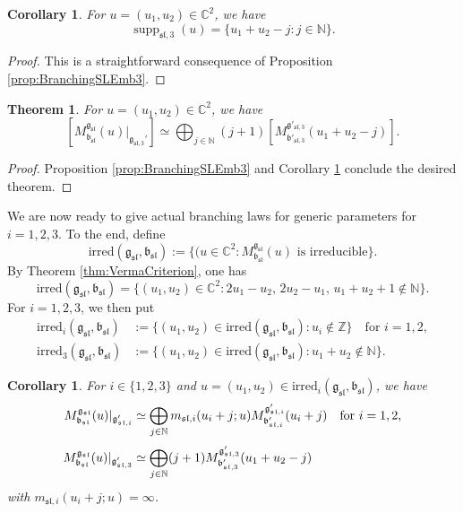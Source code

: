 \documentclass[a4paper,11pt,reqno]{amsart}
\newcommand{\frakg}{\mathfrak{g}}
\newcommand{\CC}{\mathbb{C}}
\newcommand{\0}{{\bf 0}}
\newcommand{\N}{\mathbb{N}}
\newcommand{\Z}{\mathbb{Z}}
\newcommand{\C}{\mathbb{C}}
\newcommand{\1}{{\bf 1}}
\newcommand{\frakb}{{\mathfrak b}}
\newcommand{\irred}{\mathrm{irred}}
\DeclareMathOperator{\supp}{supp}
\newcommand{\fraksl}{{\mathfrak{sl}}}
\newcommand{\Mbsl}{M^{\frakg_{\fraksl}}_{\frakb_{\fraksl}}}
\theoremstyle{plain}
\newtheorem{theorem}[equation]{Theorem}
\newtheorem{corollary}[equation]{Corollary}
\theoremstyle{definition}
\numberwithin{equation}{section}
\theoremstyle{definition}
\begin{document}
\begin{corollary}\label{cor:support_SL3}
For $u=(u_1,u_2) \in \C^2$, we have 
\begin{equation*}
\supp_{\fraksl,3}(u)
=\{u_1+u_2-j: j \in \N\}.
\end{equation*}
\end{corollary}

\begin{proof}
This is a straightforward consequence of Proposition \ref{prop:BranchingSLEmb3}.
\end{proof}

\begin{theorem}\label{thm:BranchingEmb_SL3}
For $u=(u_1, u_2) \in \CC^2$,
we have
\begin{equation}\label{eqn:bGVM_Emb3_sl}
[\Mbsl(u)\vert_{\frakg_{\fraksl,3}'}]
\simeq 
\bigoplus_{j\in \N}
(j+1)
[M^{\frakg'_{\fraksl,3}}_{\frakb'_{\fraksl,3}}(u_1+u_2-j)].
\end{equation}
\end{theorem}

\begin{proof}
Proposition \ref{prop:BranchingSLEmb3} and
Corollary \ref{cor:support_SL3}  conclude the desired theorem.
\end{proof}

We are now ready to 
give actual branching laws for generic parameters for $i=1,2,3$.
To the end, define
\begin{equation*}
\irred(\frakg_{\fraksl},\frakb_{\fraksl})
:=\{(u \in \C^2:\text{$\Mbsl(u)$ is irreducible}\}.
\end{equation*}
By Theorem \ref{thm:VermaCriterion}, one has
\begin{equation}\label{eqn:irred_sl}
\irred(\frakg_{\fraksl},\frakb_{\fraksl})=\{(u_1,u_2) \in \C^2:
2u_1-u_2,\,
2u_2-u_1,\, 
u_1+u_2+1 \notin \N\}.
\end{equation}
For $i=1,2,3$, we then put
\begin{align*}
\irred_i(\frakg_{\fraksl},\frakb_{\fraksl})
&:=\{(u_1,u_2)\in \irred(\frakg_{\fraksl},\frakb_{\fraksl}): 
u_i \notin \Z \}\quad \text{for $i=1,2$},\\[3pt]
\irred_3(\frakg_{\fraksl},\frakb_{\fraksl})
&:=\{(u_1,u_2)\in \irred(\frakg_{\fraksl},\frakb_{\fraksl}): 
u_1+u_2 \notin \N \}.
\end{align*}

\begin{corollary}\label{cor:BranchingEmb_SL3}
For $i \in \{1,2,3\}$ and 
$u=(u_1, u_2) \in \irred_i(\frakg_{\fraksl},\frakb_{\fraksl})$,
we have
\begin{align*}
\Mbsl(u)\vert_{\frakg_{\fraksl,i}'}
&\simeq 
\bigoplus_{j \in \N}
m_{\fraksl,i}(u_i+j;u)
M^{\frakg'_{\fraksl,i}}_{\frakb'_{\fraksl,i}}(u_i + j)
\quad
\textnormal{for $i=1,2$,}\\[3pt]
\Mbsl(u)\vert_{\frakg_{\fraksl,3}'}
&\simeq 
\bigoplus_{j\in \N}
(j+1)
M^{\frakg'_{\fraksl,3}}_{\frakb'_{\fraksl,3}}(u_1+u_2-j)
\end{align*}
with $m_{\fraksl,i}(u_i+j;u)=\infty$.
\end{corollary}
\end{document}
